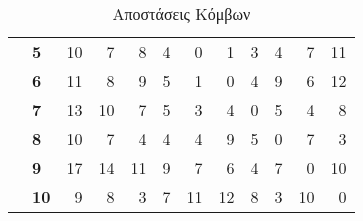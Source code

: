 \documentclass[12pt, a4paper]{article}
\begin{document}
\begin{table}[H]
\begin{tabular}{clrrrrrrrrrr}
                     & \multicolumn{1}{l|}{\textbf{5}}  & \multicolumn{1}{r|}{10}        & \multicolumn{1}{r|}{7}         & \multicolumn{1}{r|}{8}         & \multicolumn{1}{r|}{4}         & \multicolumn{1}{r|}{0}         & \multicolumn{1}{r|}{1}         & \multicolumn{1}{r|}{3}         & \multicolumn{1}{r|}{4}         & \multicolumn{1}{r|}{7}         & \multicolumn{1}{r|}{11}         \\ \cline{3-12} 
                     & \multicolumn{1}{l|}{\textbf{6}}  & \multicolumn{1}{r|}{11}        & \multicolumn{1}{r|}{8}         & \multicolumn{1}{r|}{9}         & \multicolumn{1}{r|}{5}         & \multicolumn{1}{r|}{1}         & \multicolumn{1}{r|}{0}         & \multicolumn{1}{r|}{4}         & \multicolumn{1}{r|}{9}         & \multicolumn{1}{r|}{6}         & \multicolumn{1}{r|}{12}         \\ \cline{3-12} 
                     & \multicolumn{1}{l|}{\textbf{7}}  & \multicolumn{1}{r|}{13}        & \multicolumn{1}{r|}{10}        & \multicolumn{1}{r|}{7}         & \multicolumn{1}{r|}{5}         & \multicolumn{1}{r|}{3}         & \multicolumn{1}{r|}{4}         & \multicolumn{1}{r|}{0}         & \multicolumn{1}{r|}{5}         & \multicolumn{1}{r|}{4}         & \multicolumn{1}{r|}{8}          \\ \cline{3-12} 
                     & \multicolumn{1}{l|}{\textbf{8}}  & \multicolumn{1}{r|}{10}        & \multicolumn{1}{r|}{7}         & \multicolumn{1}{r|}{4}         & \multicolumn{1}{r|}{4}         & \multicolumn{1}{r|}{4}         & \multicolumn{1}{r|}{9}         & \multicolumn{1}{r|}{5}         & \multicolumn{1}{r|}{0}         & \multicolumn{1}{r|}{7}         & \multicolumn{1}{r|}{3}          \\ \cline{3-12} 
                     & \multicolumn{1}{l|}{\textbf{9}}  & \multicolumn{1}{r|}{17}        & \multicolumn{1}{r|}{14}        & \multicolumn{1}{r|}{11}        & \multicolumn{1}{r|}{9}         & \multicolumn{1}{r|}{7}         & \multicolumn{1}{r|}{6}         & \multicolumn{1}{r|}{4}         & \multicolumn{1}{r|}{7}         & \multicolumn{1}{r|}{0}         & \multicolumn{1}{r|}{10}         \\ \cline{3-12} 
                     & \multicolumn{1}{l|}{\textbf{10}} & \multicolumn{1}{r|}{9}         & \multicolumn{1}{r|}{8}         & \multicolumn{1}{r|}{3}         & \multicolumn{1}{r|}{7}         & \multicolumn{1}{r|}{11}        & \multicolumn{1}{r|}{12}        & \multicolumn{1}{r|}{8}         & \multicolumn{1}{r|}{3}         & \multicolumn{1}{r|}{10}        & \multicolumn{1}{r|}{0}          \\ \cline{3-12} 
\end{tabular}
\caption{Αποστάσεις Κόμβων}
\end{table}
\end{document}
